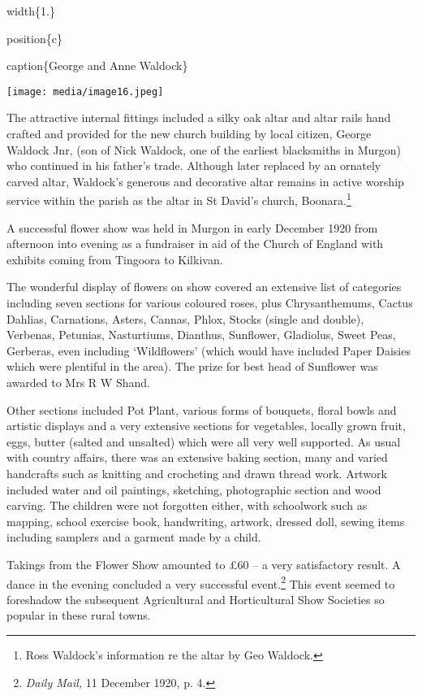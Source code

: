 width\{1.\}

position\{c\}

caption\{George and Anne Waldock\}

\texttt{[image: media/image16.jpeg]}

The attractive internal fittings included a silky oak altar and altar rails hand crafted and provided for the new church building by local citizen, George Waldock Jnr, (son of Nick Waldock, one of the earliest blacksmiths in Murgon) who continued in his father's trade. Although later replaced by an ornately carved altar, Waldock's generous and decorative altar remains in active worship service within the parish as the altar in St David's church, Boonara.\footnote{Ross Waldock's information re the altar by Geo Waldock.}

A successful flower show was held in Murgon in early December 1920 from afternoon into evening as a fundraiser in aid of the Church of England with exhibits coming from Tingoora to Kilkivan.

The wonderful display of flowers on show covered an extensive list of categories including seven sections for various coloured roses, plus Chrysanthemums, Cactus Dahlias, Carnations, Asters, Cannas, Phlox, Stocks (single and double), Verbenas, Petunias, Nasturtiums, Dianthus, Sunflower, Gladiolus, Sweet Peas, Gerberas, even including `Wildflowers' (which would have included Paper Daisies which were plentiful in the area). The prize for best head of Sunflower was awarded to Mrs R W Shand.

Other sections included Pot Plant, various forms of bouquets, floral bowls and artistic displays and a very extensive sections for vegetables, locally grown fruit, eggs, butter (salted and unsalted) which were all very well supported. As usual with country affairs, there was an extensive baking section, many and varied handcrafts such as knitting and crocheting and drawn thread work. Artwork included water and oil paintings, sketching, photographic section and wood carving. The children were not forgotten either, with schoolwork such as mapping, school exercise book, handwriting, artwork, dressed doll, sewing items including samplers and a garment made by a child.

Takings from the Flower Show amounted to £60 -- a very satisfactory result. A dance in the evening concluded a very successful event.\footnote{\emph{Daily Mail,} 11 December 1920, p. 4.} This event seemed to foreshadow the subsequent Agricultural and Horticultural Show Societies so popular in these rural towns.

